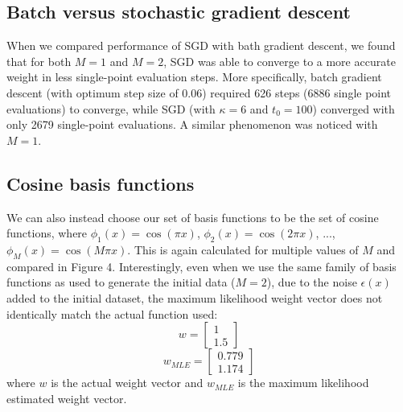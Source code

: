 \documentclass{article}
\begin{document}
\subsection{Batch versus stochastic gradient descent}
When we compared performance of SGD with bath gradient descent, we found that for both $M = 1$ and $M = 2$, SGD was able to converge to a more accurate weight in less single-point evaluation steps. More specifically, batch gradient descent (with optimum step size of 0.06) required 626 steps (6886 single point evaluations) to converge, while SGD (with $\kappa = 6$ and $t_{0} = 100$) converged with only 2679 single-point evaluations. A similar phenomenon was noticed with $M = 1$.

\subsection{Cosine basis functions}
We can also instead choose our set of basis functions to be the set of cosine functions, where $\phi_1(x) = \cos(\pi x)$, $\phi_2(x) = \cos(2 \pi x)$, ..., $\phi_M(x) = \cos(M \pi x)$. This is again calculated for multiple values of $M$ and compared in Figure 4. Interestingly, even when we use the same family of basis functions as used to generate the initial data ($M=2$), due to the noise $\epsilon(x)$ added to the initial dataset, the maximum likelihood weight vector does not identically match the actual function used:
$$ w =
\begin{bmatrix}
  1 \\
  1.5
\end{bmatrix}$$
$$ w_{MLE} =
\begin{bmatrix}
  0.779 \\
  1.174
\end{bmatrix}$$
where $w$ is the actual weight vector and $w_{MLE}$ is the maximum likelihood estimated weight vector.
\end{document}
